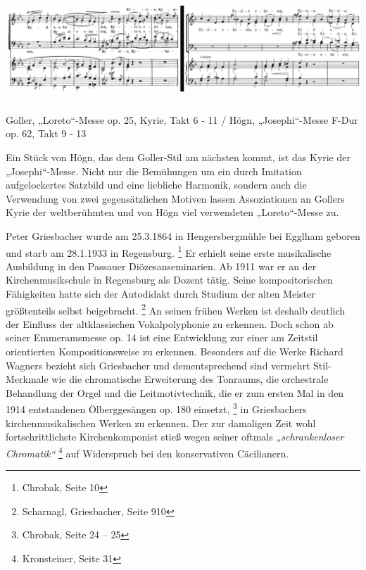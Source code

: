 \includegraphics[width=15.977cm,height=3.87cm]{pictures/zulassungsarbeit-img090.png}
\begin{figure}
\img{}
\caption{}
\end{figure}
Goller, „Loreto“-Messe op. 25, Kyrie,
Takt 6 - 11 / Högn, „Josephi“-Messe F-Dur op. 62, Takt 9 - 13

Ein Stück von Högn, das dem Goller-Stil am nächsten kommt, ist das Kyrie
der „Josephi“-Messe. Nicht nur die Bemühungen um ein durch Imitation
aufgelockertes Satzbild und eine liebliche Harmonik, sondern auch die
Verwendung von zwei gegensätzlichen Motiven lassen Assoziationen an
Gollers Kyrie der weltberühmten und von Högn viel verwendeten
„Loreto“-Messe zu.

Peter Griesbacher wurde am 25.3.1864 in Hengersbergmühle bei Egglham
geboren und starb am 28.1.1933 in Regensburg. \footnote{Chrobak, Seite
10} Er erhielt seine erste musikalische Ausbildung in den Passauer
Diözesanseminarien. Ab 1911 war er an der Kirchenmusikschule in
Regensburg als Dozent tätig. Seine kompositorischen Fähigkeiten hatte
sich der Autodidakt durch Studium der alten Meister größtenteils selbst
beigebracht. \footnote{Scharnagl, Griesbacher, Seite 910} An seinen
frühen Werken ist deshalb deutlich der Einfluss der altklassischen
Vokalpolyphonie zu erkennen. Doch schon ab seiner Emmeramsmesse op. 14
ist eine Entwicklung zur einer am Zeitstil orientierten
Kompositionsweise zu erkennen. Besonders auf die Werke Richard Wagners
bezieht sich Griesbacher und dementsprechend sind vermehrt
Stil-Merkmale wie die chromatische Erweiterung des Tonraums, die
orchestrale Behandlung der Orgel und die Leitmotivtechnik, die er zum
ersten Mal in den 1914 entstandenen Ölberggesängen op. 180
einsetzt, \footnote{Chrobak, Seite 24 – 25} in Griesbachers
kirchenmusikalischen Werken zu erkennen. Der zur damaligen Zeit wohl
fortschrittlichste Kirchenkomponist stieß wegen seiner oftmals
\textit{„schrankenloser Chromatik“ } \footnote{Kronsteiner, Seite 31}
auf Widerspruch bei den konservativen Cäcilianern.

